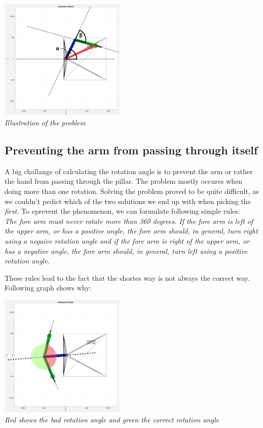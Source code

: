 \begin{center}
\includegraphics[width=0.45\textwidth]{imgs/AngleCalc/robot_rotAngleCalc.jpg}\\
\textit{Illustration of the problem}
\end{center}


\subsection{Preventing the arm from passing through itself}
A big challange of calculating the rotation angle is to prevent the arm or rather the hand from passing through the pillar. The problem mostly occures when doing more than one rotation. Solving the problem proved to be quite difficult, as we couldn't pedict which of the two solutions we end up with when picking the {\em first.} To eprevent the phenomenon, we can formulate following simple rules:\\

{\em The fore arm must never rotate more than 360 degrees. If the fore arm is left of the upper arm, or has a positive angle, the fore arm should, in general, turn right using a negaive rotation angle and if the fore arm is right of the upper arm, or has a negative angle, the fore arm should, in general, turn left using a positive rotation angle.}

These rules lead to the fact that the shortes way is not always the correct way. Following graph shows why:

\begin{center}
\includegraphics[width=0.45\textwidth]{imgs/AngleCalc/robot_passThroughProblem.jpg}\\
\textit{Red shows the bad rotation angle and green the correct rotation angle}
\end{center}

